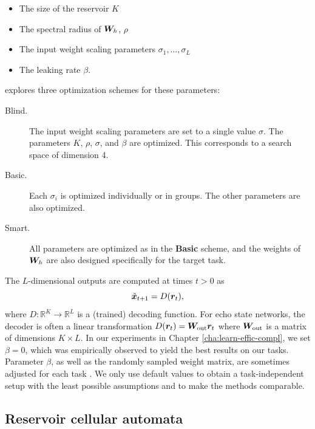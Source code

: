 \begin{itemize}
  \item The size of the reservoir $K$
  \item The spectral radius of ${\bm{W}}_{h}$, $\rho$
  \item The input weight scaling parameters $\sigma_{1}, \ldots, \sigma_{L}$
  \item The leaking rate $\beta$.
\end{itemize}

\textcite{jaegerLongShortTermMemory2012} explores three
optimization schemes for these parameters:
\begin{description}
  \item[Blind.] The input weight scaling parameters are set to a single
        value $\sigma$. The parameters $K$, $\rho$, $\sigma$, and $\beta$ are
        optimized. This corresponds to a search space of dimension 4.
  \item[Basic.] Each $\sigma_{i}$ is optimized individually or in
        groups. The other parameters are also optimized.
  \item[Smart.] All parameters are optimized as in the \textbf{Basic}
        scheme, and the weights of ${\bm{W}}_{h}$ are also designed specifically for
        the target task.
\end{description}


The $L$-dimensional outputs are computed at times $t > 0$ as
\begin{equation}
  \label{eq:esn-res}
\tilde{{\bm{x}}}_{t+ 1} = D({\bm{r}}_{t}),
\end{equation}
where $D: \mathbb{R}^{K} \rightarrow \mathbb{R}^{L}$ is a (trained) decoding
function. For echo state networks, the decoder is often a linear transformation
$D({\bm{r}}_{t}) = {\bm{W}}_{\text{out}} {\bm{r}}_{t}$ where ${\bm{W}}_{\text{out}}$ is a
matrix of dimensions $K \times L$. In our experiments in Chapter \ref{cha:learn-effic-compl}, 
we set $\beta = 0$, which
was empirically observed to yield the best results on our tasks. Parameter
$\beta$, as well as the randomly sampled weight matrix, are sometimes adjusted for
each task \parencite{jaegerLongShortTermMemory2012}. We only use default values
to obtain a task-independent setup with the least possible assumptions and to make
the methods comparable.

\subsection{Reservoir cellular automata\label{sec:app-ca-res}}

